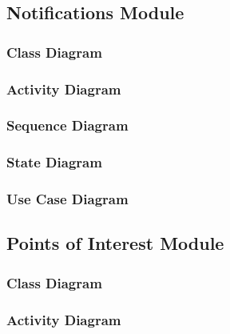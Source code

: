 \documentclass{article}
\begin{document}
		\clearpage			
			
		\subsection{Notifications Module}\label{subsec:uml-diagrams-notifications}
		
		
			\subsubsection{Class Diagram}\label{subsec:uml-diagrams-notifications-class}
			
			
			\subsubsection{Activity Diagram}\label{subsec:uml-diagrams-notifications-act}
			
			
			\subsubsection{Sequence Diagram}\label{subsec:uml-diagrams-notifications-seq}
						
			
			\subsubsection{State Diagram}\label{subsec:uml-diagrams-notifications-state}
			
			
			\subsubsection{Use Case Diagram}\label{subsec:uml-diagrams-notifications-uc}
		
		\clearpage

		\subsection{Points of Interest Module}\label{subsec:uml-diagrams-poi}
		

			\subsubsection{Class Diagram}\label{subsec:uml-diagrams-poi-class}
			
			
			\subsubsection{Activity Diagram}\label{subsec:uml-diagrams-poi-act}
			
\end{document}
